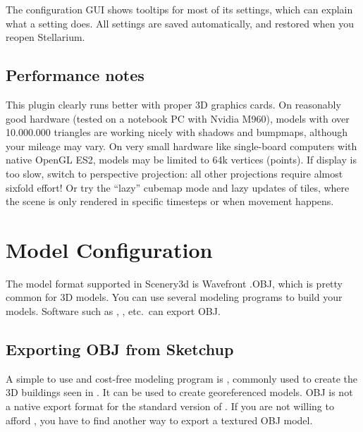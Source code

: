 The configuration GUI shows tooltips for most of its settings, which can explain
what a setting does. All settings are saved automatically, and restored when you
reopen Stellarium.


\subsection{Performance notes}
\label{sec:scenery3d:Performance}

This plugin clearly runs better with proper 3D graphics cards. 
On reasonably good hardware 
(tested on a notebook PC with Nvidia M960), models with over 10.000.000 triangles 
are working nicely with shadows and bumpmaps, although your mileage may vary.  On very small
hardware like single-board computers with native OpenGL ES2, models
may be limited to 64k vertices (points).  If display is too slow,
switch to perspective projection: all other projections require almost
sixfold effort!  Or try the ``lazy'' cubemap mode and lazy updates of tiles, 
where the scene is only rendered in specific timesteps or
when movement happens.  


\section{Model Configuration}
\label{sec:scenery3d:ModelConfiguration}

The model format supported in Scenery3d is Wavefront .OBJ, which is
pretty common for 3D models.  You can use several modeling programs to
build your models. Software such as , ,  etc.\ can export OBJ. 

\subsection{Exporting OBJ from Sketchup}
\label{sec:scenery3d:sketchup}

A simple to use and cost-free modeling program is , commonly
used to create the 3D buildings seen in . It can be used
to create georeferenced models.  OBJ is not a native export format for
the standard version of . If you are not willing to
afford , you have to find another way to export a textured
OBJ model.


